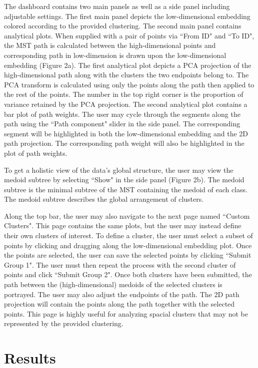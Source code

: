 \documentclass{article}
\begin{document}
The dashboard contains two main panels as well as a side panel including adjustable settings. The first main panel depicts the low-dimensional embedding colored according to the provided clustering. The second main panel contains analytical plots. When supplied with a pair of points via ``From ID" and ``To ID", the MST path is calculated between the high-dimensional points and corresponding path in low-dimension is drawn upon the low-dimensional embedding (Figure 2a). The first analytical plot depicts a PCA projection of the high-dimensional path along with the clusters the two endpoints belong to. The PCA transform is calculated using only the points along the path then applied to the rest of the points. The number in the top right corner is the proportion of variance retained by the PCA projection. The second analytical plot contains a bar plot of path weights. The user may cycle through the segments along the path using the ``Path component" slider in the side panel. The corresponding segment will be highlighted in both the low-dimensional embedding and the 2D path projection. The corresponding path weight will also be highlighted in the plot of path weights.

To get a holistic view of the data's global structure, the user may view the medoid subtree by selecting ``Show" in the side panel (Figure 2b). The medoid subtree is the minimal subtree of the MST containing the medoid of each class. The medoid subtree describes the global arrangement of clusters.

Along the top bar, the user may also navigate to the next page named ``Custom Clusters". This page contains the same plots, but the user may instead define their own clusters of interest. To define a cluster, the user must select a subset of points by clicking and dragging along the low-dimensional embedding plot. Once the points are selected, the user can save the selected points by clicking ``Submit Group 1". The user must then repeat the process with the second cluster of points and click ``Submit Group 2". Once both clusters have been submitted, the path between the (high-dimensional) medoids of the selected clusters is portrayed. The user may also adjust the endpoints of the path. The 2D path projection will contain the points along the path together with the selected points. This page is highly useful for analyzing spacial clusters that may not be represented by the provided clustering.

\section{Results}
\end{document}

